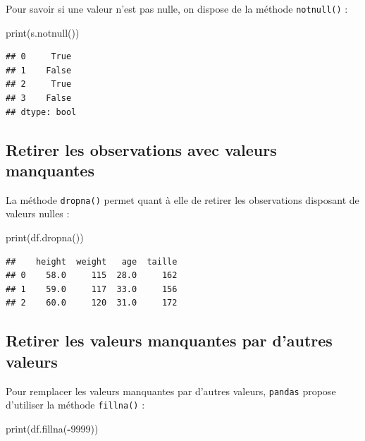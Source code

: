 \documentclass[12pt,]{book}
\newenvironment{Shaded}{\begin{snugshade}}{\end{snugshade}}
\newcommand{\DecValTok}[1]{\textcolor[rgb]{0.00,0.00,0.81}{#1}}
\newcommand{\OperatorTok}[1]{\textcolor[rgb]{0.81,0.36,0.00}{\textbf{#1}}}
\newcommand{\BuiltInTok}[1]{#1}
\newcommand{\NormalTok}[1]{#1}
\numberwithin{equation}{section}
\numberwithin{countremarque}{section}
\begin{document}
Pour savoir si une valeur n'est pas nulle, on dispose de la méthode
\texttt{notnull()} :

\begin{Shaded}
\begin{Highlighting}[]
\BuiltInTok{print}\NormalTok{(s.notnull())}
\end{Highlighting}
\end{Shaded}

\begin{lstlisting}
## 0     True
## 1    False
## 2     True
## 3    False
## dtype: bool
\end{lstlisting}

\subsection{Retirer les observations avec valeurs
manquantes}\label{retirer-les-observations-avec-valeurs-manquantes}

La méthode \texttt{dropna()} permet quant à elle de retirer les
observations disposant de valeurs nulles :

\begin{Shaded}
\begin{Highlighting}[]
\BuiltInTok{print}\NormalTok{(df.dropna())}
\end{Highlighting}
\end{Shaded}

\begin{lstlisting}
##    height  weight   age  taille
## 0    58.0     115  28.0     162
## 1    59.0     117  33.0     156
## 2    60.0     120  31.0     172
\end{lstlisting}

\subsection{Retirer les valeurs manquantes par d'autres
valeurs}\label{retirer-les-valeurs-manquantes-par-dautres-valeurs}

Pour remplacer les valeurs manquantes par d'autres valeurs,
\texttt{pandas} propose d'utiliser la méthode \texttt{fillna()} :

\begin{Shaded}
\begin{Highlighting}[]
\BuiltInTok{print}\NormalTok{(df.fillna(}\OperatorTok{-}\DecValTok{9999}\NormalTok{))}
\end{Highlighting}
\end{Shaded}
\end{document}
